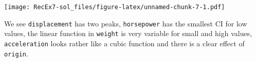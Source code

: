 \documentclass[
]{article}
\begin{document}
\texttt{[image: RecEx7-sol\_files/figure-latex/unnamed-chunk-7-1.pdf]}

We see \texttt{displacement} has two peaks, \texttt{horsepower} has the
smallest CI for low values, the linear function in \texttt{weight} is
very variable for small and high values, \texttt{acceleration} looks
rather like a cubic function and there is a clear effect of
\texttt{origin}.
\end{document}
